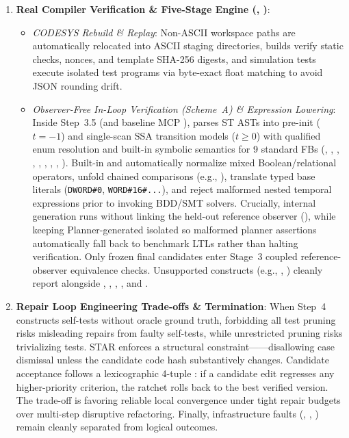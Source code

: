 \begin{enumerate}
\begin{itemize}
    \end{itemize}
  \item \textbf{Real Compiler Verification \& Five-Stage  Engine (, )}:
    \begin{itemize}
      \item \emph{CODESYS Rebuild \&  Replay}: Non-ASCII workspace paths are automatically relocated into ASCII staging directories, builds verify  static checks, nonces, and template SHA-256 digests, and simulation tests execute isolated  test programs via  byte-exact float matching to avoid JSON rounding drift.
      \item \emph{Observer-Free In-Loop Verification (Scheme~A) \& Expression Lowering}: Inside Step~3.5 (and baseline MCP ),  parses ST ASTs into pre-init ($t=-1$) and single-scan SSA transition models ($t \ge 0$) with qualified enum resolution and built-in symbolic semantics for 9 standard FBs (, , , , , , , , ). Built-in  and  automatically normalize mixed Boolean/relational operators, unfold chained comparisons (e.g., ), translate typed base literals (\texttt{\small DWORD\#0}, \texttt{\small WORD\#16\#...}), and reject malformed nested temporal expressions prior to invoking BDD/SMT solvers. Crucially, internal generation runs  without linking the held-out reference observer (), while keeping Planner-generated  isolated so malformed planner assertions automatically fall back to benchmark LTLs rather than halting verification. Only frozen final candidates enter Stage~3 coupled reference-observer equivalence checks. Unsupported constructs (e.g., , ) cleanly report  alongside , , , , and .
    \end{itemize}
  \item \textbf{Repair Loop Engineering Trade-offs \& Termination}:
    When Step~4 constructs self-tests without oracle ground truth, forbidding all test pruning risks misleading repairs from faulty self-tests, while unrestricted pruning risks trivializing tests. STAR enforces a structural constraint---\textbf{}---disallowing case dismissal unless the candidate code hash substantively changes. Candidate acceptance follows a lexicographic 4-tuple : if a candidate edit regresses any higher-priority criterion, the ratchet rolls back to the best verified version. The trade-off is favoring reliable local convergence under tight repair budgets over multi-step disruptive refactoring. Finally, infrastructure faults (, , ) remain cleanly separated from logical outcomes.
\end{enumerate}

